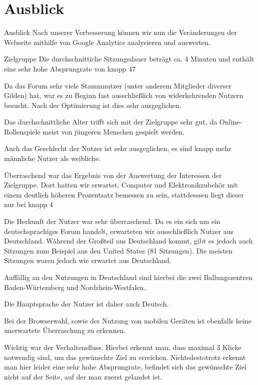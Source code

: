 \chapter{Ausblick}

Ausblick
Nach unserer Verbesserung können wir nun die Veränderungen der Webseite mithilfe von Google Analytics analysieren und auswerten.

Zielgruppe
Die durchschnittiche Sitzungsdauer beträgt ca. 4 Minuten und enthält eine sehr hohe Absprungrate von knapp 47%


Da das Forum sehr viele Stammnutzer (unter anderem Mitglieder diverser Gilden) hat, war es zu Beginn fast ausschließlich von widerkehrenden Nutzern besucht. Nach der Optimierung ist dies sehr ausgeglichen.


Das durchschnittliche Alter trifft sich mit der Zielgruppe sehr gut, da Online-Rollenspiele meist von jüngeren Menschen gespielt werden.



Auch das Geschlecht der Nutzer ist sehr ausgeglichen, es sind knapp mehr männliche Nutzer als weibliche.




Überraschend war das Ergebnis von der Auswertung der Interessen der Zielgruppe. Dort hatten wir erwartet, Computer und Elektronikzubehör mit einem deutlich höheren Prozentsatz bemessen zu sein, stattdesssen liegt dieser nur bei knapp 4%

Die Herkunft der Nutzer war sehr überraschend. Da es ein sich um ein deutschsprachiges Forum handelt, erwarteten wir ausschließlich Nutzer aus Deutschland. Während der Großteil aus Deutschland kommt, gibt es jedoch auch Sitzungen zum Beispiel aus den United States (81 Sitzungen).
Die meisten Sitzungen waren jedoch wie erwartet aus Deutschland.


Auffällig an den Nutzungen in Deutschland sind hierbei die zwei Ballungszentren Baden-Würtemberg und Nordrhein-Westfalen.

Die Hauptsprache der Nutzer ist daher auch Deutsch.

Bei der Browserwahl, sowie der Nutzung von mobilen Geräten ist ebenfalls keine unerwartete Überraschung zu erkennen.




Wichtig war der Verhaltensfluss. Hierbei erkennt man, dass maximal 3 Klicke notwendig sind, um das gewünschte Ziel zu erreichen. Nichtsdestotrotz erkennt man hier leider eine sehr hohe Absprungrate, befindet sich das gewünschte Ziel nicht auf der Seite, auf der man zuerst gelandet ist.






